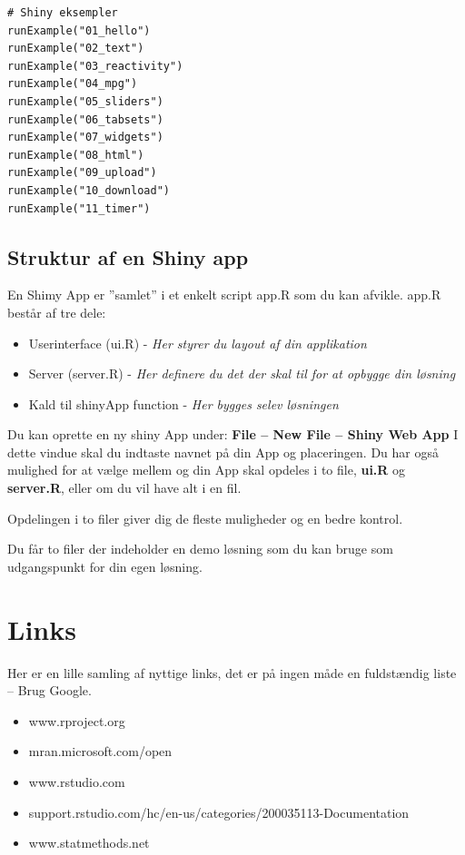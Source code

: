 \documentclass[
]{book}
\providecommand{\tightlist}{%
  \setlength{\itemsep}{0pt}\setlength{\parskip}{0pt}}
\begin{document}
\begin{verbatim}
# Shiny eksempler
runExample("01_hello")
runExample("02_text")
runExample("03_reactivity")
runExample("04_mpg")
runExample("05_sliders")
runExample("06_tabsets")
runExample("07_widgets")
runExample("08_html")
runExample("09_upload")
runExample("10_download")
runExample("11_timer")
\end{verbatim}

\hypertarget{struktur-af-en-shiny-app}{%
\section{Struktur af en Shiny app}\label{struktur-af-en-shiny-app}}

En Shimy App er ''samlet'' i et enkelt script app.R som du kan afvikle.
app.R består af tre dele:

\begin{itemize}
\tightlist
\item
  Userinterface (ui.R) - \emph{Her styrer du layout af din applikation}
\item
  Server (server.R) - \emph{Her definere du det der skal til for at opbygge din løsning}
\item
  Kald til shinyApp function - \emph{Her bygges selev løsningen}
\end{itemize}

Du kan oprette en ny shiny App under:
\textbf{File -- New File -- Shiny Web App}
I dette vindue skal du indtaste navnet på din App og placeringen. Du har også mulighed for at vælge mellem og din App skal opdeles i to file, \textbf{ui.R} og \textbf{server.R}, eller om du vil have alt i en fil.

Opdelingen i to filer giver dig de fleste muligheder og en bedre kontrol.

Du får to filer der indeholder en demo løsning som du kan bruge som
udgangspunkt for din egen løsning.

\hypertarget{links}{%
\chapter{Links}\label{links}}

Her er en lille samling af nyttige links, det er på ingen måde en fuldstændig liste -- Brug Google.

\begin{itemize}
\tightlist
\item
  www.rproject.org
\item
  mran.microsoft.com/open
\item
  www.rstudio.com
\item
  support.rstudio.com/hc/en-us/categories/200035113-Documentation
\item
  www.statmethods.net
\end{itemize}

  
\end{document}
